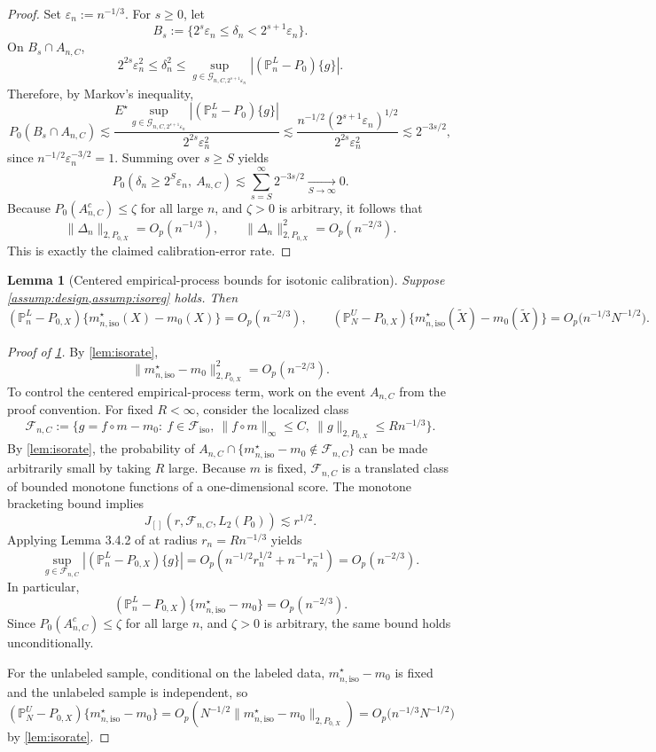 \documentclass{article}
\theoremstyle{plain}
\newtheorem{lemma}{Lemma}
\theoremstyle{definition}
\newcommand{\1}{\mathbbm{1}}
\newcommand{\mhat}{m}
\newcommand{\Pl}{\mathbb{P}^{L}_n}
\newcommand{\Pu}{\mathbb{P}^{U}_N}
\newcommand{\Px}{P_{0,X}}
\begin{document}
\begin{proof}
Set \(\varepsilon_n:=n^{-1/3}\). For \(s\ge 0\), let
\[
B_s:=\{2^s\varepsilon_n\le \delta_n<2^{s+1}\varepsilon_n\}.
\]
On \(B_s\cap A_{n,C}\),
\[
2^{2s}\varepsilon_n^2
\le
\delta_n^2
\le
\sup_{g\in\mathcal G_{n,C,2^{s+1}\varepsilon_n}}|(\Pl-P_0)\{g\}|.
\]
Therefore, by Markov's inequality,
\[
P_0(B_s\cap A_{n,C})
\lesssim
\frac{E^\star\sup_{g\in\mathcal G_{n,C,2^{s+1}\varepsilon_n}}|(\Pl-P_0)\{g\}|}{2^{2s}\varepsilon_n^2}
\lesssim
\frac{n^{-1/2}(2^{s+1}\varepsilon_n)^{1/2}}{2^{2s}\varepsilon_n^2}
\lesssim
2^{-3s/2},
\]
since \(n^{-1/2}\varepsilon_n^{-3/2}=1\). Summing over \(s\ge S\) yields
\[
P_0(\delta_n\ge 2^S\varepsilon_n,\ A_{n,C})
\lesssim
\sum_{s=S}^\infty 2^{-3s/2}
\xrightarrow[S\to\infty]{} 0.
\]
Because \(P_0(A_{n,C}^c)\le \zeta\) for all large \(n\), and \(\zeta>0\) is arbitrary, it follows that
\[
\|\Delta_n\|_{2,\Px}=O_p(n^{-1/3}),
\qquad
\|\Delta_n\|_{2,\Px}^2=O_p(n^{-2/3}).
\]
This is exactly the claimed calibration-error rate.
\end{proof}

\begin{lemma}[Centered empirical-process bounds for isotonic calibration]
\label{lem:eprate}
Suppose \cref{assump:design,assump:isoreg} holds. Then
\[
(\Pl-\Px)\{m_{n,\mathrm{iso}}^\star(X)-m_0(X)\}=O_p(n^{-2/3}),
\qquad
(\Pu-\Px)\{m_{n,\mathrm{iso}}^\star(\widetilde X)-m_0(\widetilde X)\}=O_p\bigl(n^{-1/3}N^{-1/2}\bigr).
\]
\end{lemma}

\begin{proof}[Proof of \cref{lem:eprate}]
By \cref{lem:isorate},
\[
\|m_{n,\mathrm{iso}}^\star-m_0\|_{2,\Px}^2=O_p(n^{-2/3}).
\]
To control the centered empirical-process term, work on the event \(A_{n,C}\) from the proof convention. For fixed \(R<\infty\), consider the localized class
\[
\mathcal F_{n,C}
:=
\{g=f\circ\mhat-m_0:\ f\in\mathcal F_{\mathrm{iso}},\ \|f\circ\mhat\|_\infty\le C,\ \|g\|_{2,\Px}\le Rn^{-1/3}\}.
\]
By \cref{lem:isorate}, the probability of \(A_{n,C}\cap\{m_{n,\mathrm{iso}}^\star-m_0\notin\mathcal F_{n,C}\}\) can be made arbitrarily small by taking \(R\) large. Because \(\mhat\) is fixed, \(\mathcal F_{n,C}\) is a translated class of bounded monotone functions of a one-dimensional score. The monotone bracketing bound implies
\[
J_{[]}\!\left(r,\mathcal F_{n,C},L_2(P_0)\right)\lesssim r^{1/2}.
\]
Applying Lemma 3.4.2 of \citet{vdvwellner1996} at radius \(r_n=Rn^{-1/3}\) yields
\[
\sup_{g\in\mathcal F_{n,C}} |(\Pl-\Px)\{g\}|
=
O_p\!\left(n^{-1/2}r_n^{1/2}+n^{-1}r_n^{-1}\right)
=
O_p(n^{-2/3}).
\]
In particular,
\[
(\Pl-\Px)\{m_{n,\mathrm{iso}}^\star-m_0\}=O_p(n^{-2/3}).
\]
Since \(P_0(A_{n,C}^c)\le \zeta\) for all large \(n\), and \(\zeta>0\) is arbitrary, the same bound holds unconditionally.

For the unlabeled sample, conditional on the labeled data, \(m_{n,\mathrm{iso}}^\star-m_0\) is fixed and the unlabeled sample is independent, so
\[
(\Pu-\Px)\{m_{n,\mathrm{iso}}^\star-m_0\}
=
O_p\left(N^{-1/2}\|m_{n,\mathrm{iso}}^\star-m_0\|_{2,\Px}\right)
=
O_p\bigl(n^{-1/3}N^{-1/2}\bigr)
\]
by \cref{lem:isorate}.
\end{proof}
\end{document}
